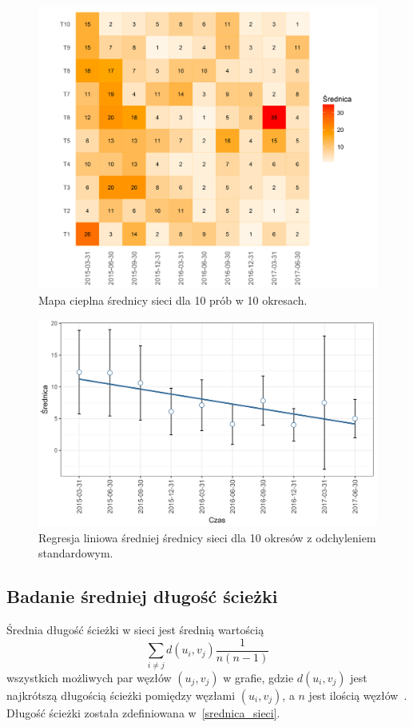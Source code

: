 \documentclass[12pt, oneside, final, openany]{mgr}
\newcommand{\chartsWidth}{0.80}
\begin{document}
\if@archive\else{\newpage}\fi
\begin{figure}[H]
\centering
  \includegraphics[width=\chartsWidth\linewidth]{pictures/srednica/srednica_hm.png}
  \caption{Mapa cieplna średnicy sieci dla 10 prób w 10 okresach.}
  \label{fig:s1} 
\end{figure}
\begin{figure}[H]
\centering
  \includegraphics[width=\chartsWidth\linewidth]{pictures/srednica/srednica_sda.png}
  \caption{Regresja liniowa średniej średnicy sieci dla 10 okresów z odchyleniem standardowym.}
  \label{fig:s2}
\end{figure}


\if@archive\else{\newpage}\fi
\subsection{Badanie średniej długość ścieżki}
\label{dlugosc_sciezki}
\indent Średnia długość ścieżki w sieci jest średnią wartością 
\begin{equation}
\label{eq:dlugosc_sciezki}
	\sum_{i \ne j}^{} d(u_i,v_j)\frac{1}{n(n-1)}
\end{equation}
wszystkich możliwych par węzłów $(u_j,v_j)$ w grafie, gdzie $d(u_i,v_j)$ jest najkrótszą długością ścieżki pomiędzy węzłami $(u_i,v_j)$, a $n$ jest ilością węzłów~\cite{wasserman1994social}. Długość ścieżki została zdefiniowana w~\ref{srednica_sieci}. 
\end{document}
